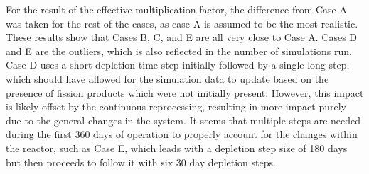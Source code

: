 

For the result of the effective multiplication factor, the difference from Case A was taken for the rest of the cases, as case A is assumed to be the most realistic.
These results show that Cases B, C, and E are all very close to Case A. Cases D and E are the outliers, which is also reflected in the number of simulations run. Case D uses a short depletion time step initially followed by a single long step, which should have allowed for the simulation data to update based on the presence of fission products which were not initially present.
However, this impact is likely offset by the continuous reprocessing, resulting in more impact purely due to the general changes in the system. It seems that multiple steps are needed during the first 360 days of operation to properly account for the changes within the reactor, such as Case E, which leads with a depletion step size of 180 days but then proceeds to follow it with six 30 day depletion steps.

